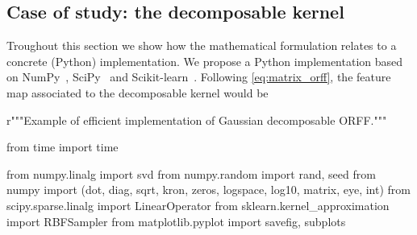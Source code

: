 \subsection{Case of study: the decomposable kernel}
Troughout this section we show how the mathematical formulation relates to a
concrete (Python) implementation. We propose a Python implementation based on
NumPy~\citep{oliphant2006guide}, SciPy~\citep{jones2014scipy} and
Scikit-learn~\citep{pedregosa2011scikit}. Following \cref{eq:matrix_orff}, the
feature map associated to the decomposable kernel would be
\begin{pycode}
r"""Example of efficient implementation of Gaussian decomposable ORFF."""

from time import time

from numpy.linalg import svd
from numpy.random import rand, seed
from numpy import (dot, diag, sqrt, kron, zeros,
                   logspace, log10, matrix, eye, int)
from scipy.sparse.linalg import LinearOperator
from sklearn.kernel_approximation import RBFSampler
from matplotlib.pyplot import savefig, subplots
\end{pycode}

